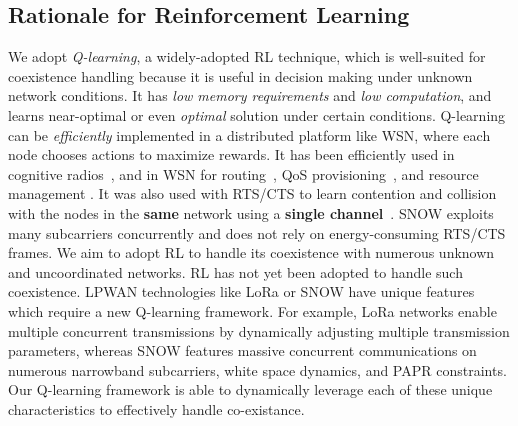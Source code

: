  
\subsection{Rationale for Reinforcement Learning} 
 We adopt {\slshape Q-learning},  a widely-adopted RL technique, which is well-suited for coexistence handling because it is useful in decision making under unknown network conditions. It has {\slshape low memory requirements} and {\slshape low computation}, and learns  near-optimal or even {\slshape optimal} solution under certain conditions. Q-learning can be {\slshape efficiently} implemented in a distributed platform like WSN, where each node chooses actions to maximize rewards. It has been efficiently used in cognitive radios~\cite{cognitive1}, and in WSN for routing~\cite{RLRouting1, RLRouting2, RLRouting3, RLRouting4},  QoS provisioning~\cite{QoS1, QoS2}, and resource management \cite{RLSurvey}. It was also used with  RTS/CTS  to learn contention and collision with the nodes in the {\bf same} network  using a {\bf single channel}~\cite{RLMAC}.  SNOW exploits many subcarriers concurrently and does not rely on energy-consuming RTS/CTS frames. We aim to adopt RL to handle its coexistence with numerous  unknown and uncoordinated networks. RL has not yet been adopted to handle such coexistence. LPWAN technologies like LoRa or SNOW have unique features which require a new Q-learning framework. For example, LoRa networks enable multiple concurrent transmissions by dynamically adjusting multiple transmission parameters, whereas SNOW features massive concurrent communications on numerous narrowband subcarriers, white space dynamics, and PAPR constraints. Our Q-learning framework is able to dynamically leverage each of these unique characteristics to effectively handle co-existance. 
 
 
   

